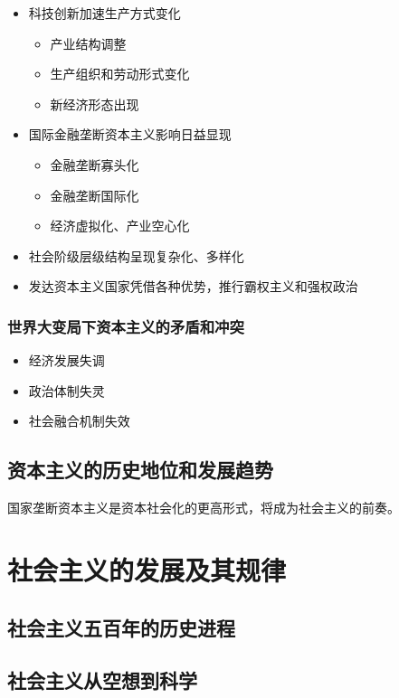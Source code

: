 \documentclass[12pt, a4paper, oneside]{ctexart}
\begin{document}
\begin{itemize}
  \item 科技创新加速生产方式变化
  \begin{itemize}
    \item 产业结构调整
    \item 生产组织和劳动形式变化
    \item 新经济形态出现
  \end{itemize}
  \item 国际金融垄断资本主义影响日益显现
  \begin{itemize}
    \item 金融垄断寡头化
    \item 金融垄断国际化
    \item 经济虚拟化、产业空心化
  \end{itemize}
  \item 社会阶级层级结构呈现复杂化、多样化
  \item 发达资本主义国家凭借各种优势，推行霸权主义和强权政治
\end{itemize}

\subsubsection{世界大变局下资本主义的矛盾和冲突}

\begin{itemize}
  \item 经济发展失调
  \item 政治体制失灵
  \item 社会融合机制失效
\end{itemize}

\subsection{资本主义的历史地位和发展趋势}

国家垄断资本主义是资本社会化的更高形式，将成为社会主义的前奏。

\section{社会主义的发展及其规律}

\subsection{社会主义五百年的历史进程}

\subsection{社会主义从空想到科学}
\end{document}
